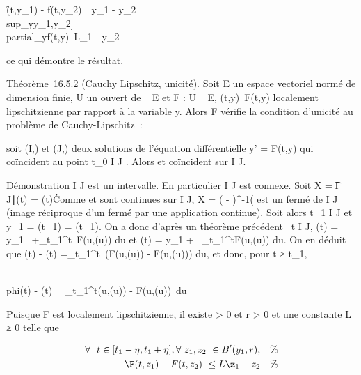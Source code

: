 \f(t,y_1) -
f(t,y_2)\ \leq\
y_1 -
y_2\\
sup_y\in{[}y_1,y_2{]}\\partial_yf(t,y)\
\leq L\y_1 -
y_2\

ce qui démontre le résultat.

Théorème~16.5.2 (Cauchy Lipschitz, unicité). Soit E un espace vectoriel
normé de dimension finie, U un ouvert de ~ \times E et F : U \rightarrow~ E,
(t,y)\mapsto~F(t,y) localement lipschitzienne par
rapport à la variable y. Alors F vérifie la condition d'unicité au
problème de Cauchy-Lipschitz~:

soit (I,\phi) et (J,\psi) deux solutions de l'équation différentielle y' =
F(t,y) qui coïncident au point t_0 \in I \bigcap J . Alors \phi et \psi
coïncident sur I \bigcap J.

Démonstration I \bigcap J est un intervalle. En particulier I \bigcap J est connexe.
Soit X = \t \in I \bigcap J∣\phi(t) =
\psi(t)\. Comme \phi et \psi sont continues sur I \bigcap J, X = (\phi
- \psi)^-1(\0\) est un fermé de
I \bigcap J (image réciproque d'un fermé par une application continue). Soit
alors t_1 \in I \bigcap J et y_1 = \phi(t_1) =
\psi(t_1). On a donc d'après un théorème précédent
\forall~t \in I \bigcap J, \phi(t) = y_1~
+\int  _t_1^t~F(u,\phi(u))
du et \psi(t) = y_1 +\int ~
_t_1^tF(u,\psi(u)) du. On en déduit que \phi(t) - \psi(t)
=\int  _t_1^t~(F(u,\phi(u))
- F(u,\psi(u))) du, et donc, pour t ≥ t_1,

\\phi(t) - \psi(t)\
\leq\int ~
_t_1^t\F(u,\phi(u)) -
F(u,\psi(u))\ du

Puisque F est localement lipschitzienne, il existe \eta \textgreater{} 0 et
r \textgreater{} 0 et une constante L ≥ 0 telle que

\begin{align*} \forall~~t \in
{[}t_1 - \eta,t_1 + \eta{]},
\forall~z_1,z_2~ \in
B'(y_1,r),& & \%& \\
\F(t,z_1) -
F(t,z_2)\ \leq
L\z_1 -
z_2& & \%&
\\ \end{align*}

